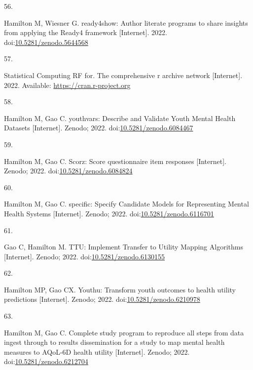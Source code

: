 \documentclass[
]{article}
\newlength{\cslhangindent}
\newlength{\csllabelwidth}
\newlength{\cslentryspacingunit} %
\newenvironment{CSLReferences}[2] %
 {%
  \setlength{\parindent}{0pt}
  \ifodd #1
  \let\oldpar\par
  \def\par{\hangindent=\cslhangindent\oldpar}
  \fi
  \setlength{\parskip}{#2\cslentryspacingunit}
 }%
 {}
\newcommand{\CSLLeftMargin}[1]{\parbox[t]{\csllabelwidth}{#1}}
\newcommand{\CSLRightInline}[1]{\parbox[t]{\linewidth - \csllabelwidth}{#1}\break}
\begin{document}
\begin{CSLReferences}{0}{0}
\leavevmode{}%
\CSLLeftMargin{56. }%
\CSLRightInline{Hamilton M, Wiesner G. ready4show: Author literate programs to share insights from applying the Ready4 framework {[}Internet{]}. 2022. doi:\href{https://doi.org/10.5281/zenodo.5644568}{10.5281/zenodo.5644568}}

\leavevmode{}%
\CSLLeftMargin{57. }%
\CSLRightInline{Statistical Computing RF for. The comprehensive r archive network {[}Internet{]}. 2022. Available: \url{https://cran.r-project.org}}

\leavevmode{}%
\CSLLeftMargin{58. }%
\CSLRightInline{Hamilton M, Gao C. {youthvars: Describe and Validate Youth Mental Health Datasets} {[}Internet{]}. Zenodo; 2022. doi:\href{https://doi.org/10.5281/zenodo.6084467}{10.5281/zenodo.6084467}}

\leavevmode{}%
\CSLLeftMargin{59. }%
\CSLRightInline{Hamilton M, Gao C. Scorz: Score questionnaire item responses {[}Internet{]}. Zenodo; 2022. doi:\href{https://doi.org/10.5281/zenodo.6084824}{10.5281/zenodo.6084824}}

\leavevmode{}%
\CSLLeftMargin{60. }%
\CSLRightInline{Hamilton M, Gao C. {specific: Specify Candidate Models for Representing Mental Health Systems} {[}Internet{]}. Zenodo; 2022. doi:\href{https://doi.org/10.5281/zenodo.6116701}{10.5281/zenodo.6116701}}

\leavevmode{}%
\CSLLeftMargin{61. }%
\CSLRightInline{Gao C, Hamilton M. {TTU: Implement Transfer to Utility Mapping Algorithms} {[}Internet{]}. Zenodo; 2022. doi:\href{https://doi.org/10.5281/zenodo.6130155}{10.5281/zenodo.6130155}}

\leavevmode{}%
\CSLLeftMargin{62. }%
\CSLRightInline{Hamilton MP, Gao CX. Youthu: Transform youth outcomes to health utility predictions {[}Internet{]}. Zenodo; 2022. doi:\href{https://doi.org/10.5281/zenodo.6210978}{10.5281/zenodo.6210978}}

\leavevmode{}%
\CSLLeftMargin{63. }%
\CSLRightInline{Hamilton M, Gao C. {Complete study program to reproduce all steps from data ingest through to results dissemination for a study to map mental health measures to AQoL-6D health utility} {[}Internet{]}. Zenodo; 2022. doi:\href{https://doi.org/10.5281/zenodo.6212704}{10.5281/zenodo.6212704}}


\end{CSLReferences}
\end{document}
